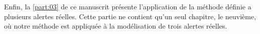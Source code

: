 Enfin, la \autoref{part:03} de ce manuscrit présente l’application de
la méthode définie a plusieurs alertes réelles. Cette partie ne
contient qu'un seul chapitre, le neuvième, où notre méthode est
appliquée à la modélisation de trois alertes réelles.


